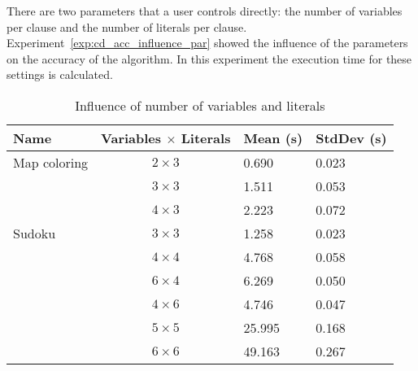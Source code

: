 \begin{experiment}
	There are two parameters that a user controls directly: the number of variables per clause and the number of literals per clause.
	Experiment~\ref{exp:cd_acc_influence_par} showed the influence of the parameters on the accuracy of the algorithm.
	In this experiment the execution time for these settings is calculated.

	\begin{table}[!htp]
		\begin{tabularx}{\textwidth}{lc|XX}
			\textbf{Name}	& \textbf{Variables $\times$ Literals}	& \textbf{Mean (s)}	& \textbf{StdDev (s)} \\
			\toprule
			Map coloring 	& $2 \times 3$ 			& 0.690				& 0.023	\\
							& $3 \times 3$ 			& 1.511				& 0.053	\\
							& $4 \times 3$ 			& 2.223				& 0.072	\\
			\midrule	
			Sudoku 			& $3 \times 3$ 			& 1.258				& 0.023	\\
							& $4 \times 4$ 			& 4.768				& 0.058	\\
							& $6 \times 4$ 			& 6.269				& 0.050	\\
							& $4 \times 6$ 			& 4.746				& 0.047	\\
							& $5 \times 5$ 			& 25.995			& 0.168	\\
							& $6 \times 6$ 			& 49.163			& 0.267
		\end{tabularx}
		\caption{Influence of number of variables and literals}
		\label{tbl:cd_speed_influence}
	\end{table}

\end{experiment}

